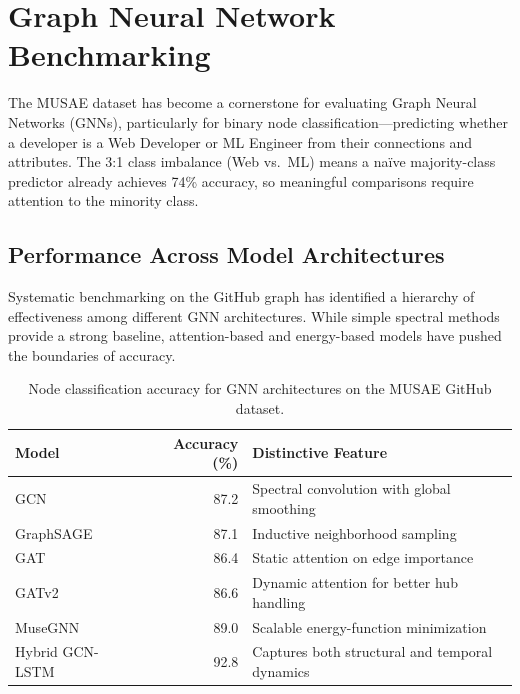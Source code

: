 \documentclass[letterpaper]{article}
\begin{document}
\section{Graph Neural Network Benchmarking}

The MUSAE dataset has become a cornerstone for evaluating Graph Neural Networks (GNNs), particularly for binary node classification---predicting whether a developer is a Web Developer or ML Engineer from their connections and attributes. The 3:1 class imbalance (Web vs.\ ML) means a na\"ive majority-class predictor already achieves 74\% accuracy, so meaningful comparisons require attention to the minority class.

\subsection{Performance Across Model Architectures}

Systematic benchmarking on the GitHub graph has identified a hierarchy of effectiveness among different GNN architectures. While simple spectral methods provide a strong baseline, attention-based and energy-based models have pushed the boundaries of accuracy.

\begin{table}[H]
  \centering
  \begin{tabular}{lrl}
    \toprule
    \textbf{Model} & \textbf{Accuracy (\%)} & \textbf{Distinctive Feature} \\
    \midrule
    GCN~\cite{kipf2017gcn}          & 87.2 & Spectral convolution with global smoothing \\
    GraphSAGE~\cite{hamilton2017graphsage} & 87.1 & Inductive neighborhood sampling \\
    GAT~\cite{velickovic2018gat}      & 86.4 & Static attention on edge importance \\
    GATv2~\cite{brody2022gatv2}       & 86.6 & Dynamic attention for better hub handling \\
    MuseGNN~\cite{musegnn2023}        & 89.0 & Scalable energy-function minimization \\
    Hybrid GCN-LSTM~\cite{fang2024gcnlstm} & 92.8 & Captures both structural and temporal dynamics \\
    \bottomrule
  \end{tabular}
  \caption{Node classification accuracy for GNN architectures on the MUSAE GitHub dataset.}
  \label{tab:gnn_benchmark}
\end{table}
\end{document}
